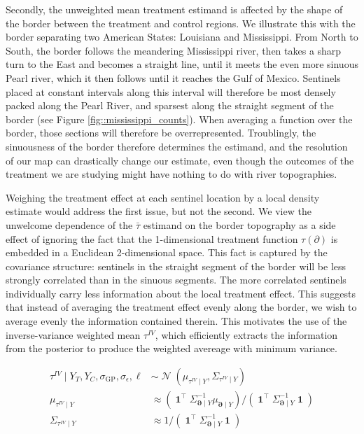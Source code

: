 \documentclass[letter]{article}
\newcommand{\genericdel}[3]{%
      \left#1#3\right#2
    }
\newcommand{\del}[1]{\genericdel(){#1}}
\DeclareMathOperator{\normal}{\mathcal{N}}
\DeclareMathOperator{\ones}{\mathbf{1}}
\newcommand{\trans}{^{\intercal}}
\newcommand{\sigmaf}{\sigma_{\mathrm{GP}}}
\newcommand{\sigman}{\sigma_{\epsilon}}
\newcommand{\boundary}{\partial}
\newcommand{\sentinels}{\bm{\boundary}}
\newcommand{\linavg}{\bar{\tau}}
\newcommand{\invvar}{\tau^{IV}}
\begin{document}
Secondly, the unweighted mean treatment estimand is affected by the
shape of the border between the treatment and control regions. We
illustrate this with the border separating two American States:
Louisiana and Mississippi. From North to South, the border follows the
meandering Mississippi river, then takes a sharp turn to the East and
becomes a straight line, until it meets the even more sinuous Pearl
river, which it then follows until it reaches the Gulf of Mexico.
Sentinels placed at constant intervals along this interval will
therefore be most densely packed along the Pearl River, and sparsest
along the straight segment of the border (see Figure
\ref{fig::mississippi_counts}). When averaging a function over the
border, those sections will therefore be overrepresented. Troublingly,
the sinuousness of the border therefore determines the estimand, and the
resolution of our map can drastically change our estimate, even though
the outcomes of the treatment we are studying might have nothing to do
with river topographies.

Weighing the treatment effect at each sentinel location by a local
density estimate would address the first issue, but not the second. We
view the unwelcome dependence of the \(\linavg\) estimand on the border
topography as a side effect of ignoring the fact that the 1-dimensional
treatment function \(\tau(\boundary)\) is embedded in a Euclidean
2-dimensional space. This fact is captured by the covariance structure:
sentinels in the straight segment of the border will be less strongly
correlated than in the sinuous segments. The more correlated sentinels
individually carry less information about the local treatment effect.
This suggests that instead of averaging the treatment effect evenly
along the border, we wish to average evenly the information contained
therein. This motivates the use of the inverse-variance weighted mean
\(\invvar\), which efficiently extracts the information from the
posterior to produce the weighted avereage with minimum variance.

\begin{equation}\begin{split}
    \invvar \mid Y_T, Y_C, \sigmaf, \sigman, \ell &\sim \normal\del{\mu_{\invvar \mid Y}, \Sigma_{\invvar \mid Y}} \\
    \mu_{\invvar \mid Y} &\approx \del{\ones\trans \Sigma_{\sentinels \mid Y}^{-1} \mu_{\sentinels \mid Y}} \big/ \del{\ones\trans \Sigma_{\sentinels \mid Y}^{-1} \ones}  \\
    \Sigma_{\invvar \mid Y} &\approx 1 \big/ \del{\ones\trans \Sigma_{\sentinels \mid Y}^{-1} \ones}
\end{split}\label{eq:invvar}\end{equation}
\end{document}
